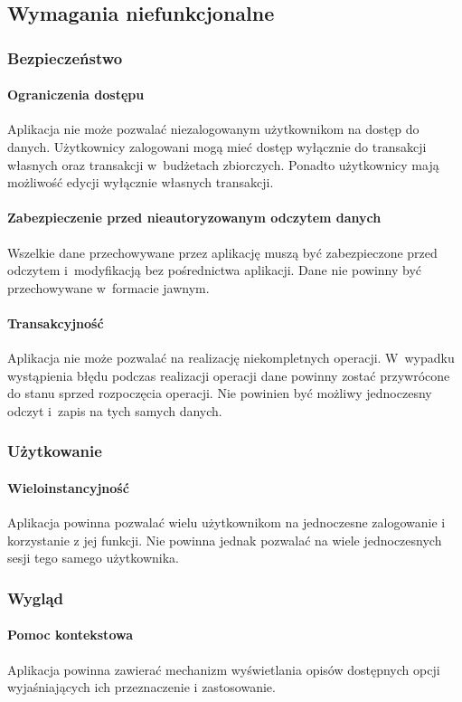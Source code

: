 \newpage
\subsection{Wymagania niefunkcjonalne}

\subsubsection{Bezpieczeństwo}

\paragraph{Ograniczenia dostępu\newline}
Aplikacja nie może pozwalać niezalogowanym użytkownikom na dostęp do danych. Użytkownicy zalogowani mogą mieć dostęp wyłącznie do transakcji własnych oraz transakcji w~budżetach zbiorczych. Ponadto użytkownicy mają możliwość edycji wyłącznie własnych transakcji.

\paragraph{Zabezpieczenie przed nieautoryzowanym odczytem danych\newline}
Wszelkie dane przechowywane przez aplikację muszą być zabezpieczone przed odczytem i~modyfikacją bez pośrednictwa aplikacji. Dane nie powinny być przechowywane w~formacie jawnym.

\paragraph{Transakcyjność\newline}
Aplikacja nie może pozwalać na realizację niekompletnych operacji. W~wypadku wystąpienia błędu podczas realizacji operacji dane powinny zostać przywrócone do stanu sprzed rozpoczęcia operacji. Nie powinien być możliwy jednoczesny odczyt i~zapis na tych samych danych.

\subsubsection{Użytkowanie}

\paragraph{Wieloinstancyjność\newline}
Aplikacja powinna pozwalać wielu użytkownikom na jednoczesne zalogowanie i korzystanie z jej funkcji. Nie powinna jednak pozwalać na wiele jednoczesnych sesji tego samego użytkownika.

\subsubsection{Wygląd}

\paragraph{Pomoc kontekstowa\newline}
Aplikacja powinna zawierać mechanizm wyświetlania opisów dostępnych opcji wyjaśniających ich przeznaczenie i zastosowanie.
